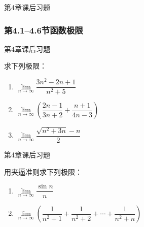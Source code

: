\documentclass[aspectratio=169,10pt,fontset=fandol]{ctexbeamer}
\begin{document}
\begin{frame}[t,fragile]{第4章课后习题}
\normalsize
{\normalsize





\subsubsection*{第4.1--4.6节\quad 函数极限}




}
\end{frame}
\begin{frame}[t,fragile]{第4章课后习题}
\normalsize
{\normalsize
求下列极限：

\begin{enumerate}

\item \(\lim\limits_{n\to\infty} \dfrac{3n^2 - 2n + 1}{n^2 + 5}\)

\item \(\lim\limits_{n\to\infty} \left(\dfrac{2n-1}{3n+2} + \dfrac{n+1}{4n-3}\right)\)

\item \(\lim\limits_{n\to\infty} \dfrac{\sqrt{n^2 + 3n} - n}{2}\)

\end{enumerate}


}
\end{frame}
\begin{frame}[t,fragile]{第4章课后习题}
\normalsize
{\normalsize
用夹逼准则求下列极限：

\begin{enumerate}

\item \(\lim\limits_{n\to\infty} \dfrac{\sin n}{n}\)

\item \(\lim\limits_{n\to\infty} \left(\dfrac{1}{n^2+1} + \dfrac{1}{n^2+2} + \cdots + \dfrac{1}{n^2+n}\right)\)

\end{enumerate}


}
\end{frame}
\end{document}
